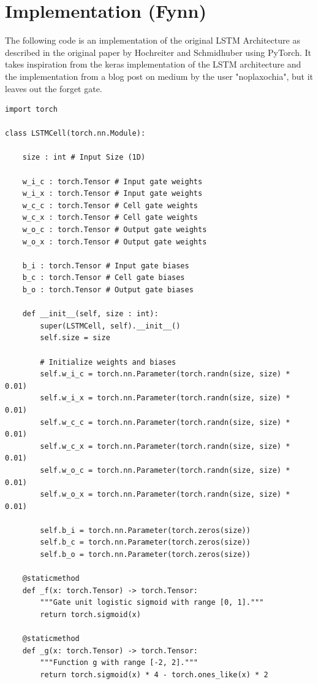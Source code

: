 \documentclass[twoside,a4paper,10pt,DIV=12,BCOR=12mm]{scrartcl}
\begin{document}
\appendix

\section{Implementation (Fynn)}

The following code is an implementation of the original LSTM Architecture as described in the original paper by Hochreiter and Schmidhuber using PyTorch. It takes inspiration from the keras implementation of the LSTM architecture and the implementation from a blog post on medium by the user "noplaxochia", but it leaves out the forget gate.

\begin{lstlisting}
import torch

class LSTMCell(torch.nn.Module):
    
    size : int # Input Size (1D)
    
    w_i_c : torch.Tensor # Input gate weights
    w_i_x : torch.Tensor # Input gate weights
    w_c_c : torch.Tensor # Cell gate weights
    w_c_x : torch.Tensor # Cell gate weights
    w_o_c : torch.Tensor # Output gate weights
    w_o_x : torch.Tensor # Output gate weights
    
    b_i : torch.Tensor # Input gate biases
    b_c : torch.Tensor # Cell gate biases
    b_o : torch.Tensor # Output gate biases
    
    def __init__(self, size : int):
        super(LSTMCell, self).__init__()
        self.size = size

        # Initialize weights and biases        
        self.w_i_c = torch.nn.Parameter(torch.randn(size, size) * 0.01)
        self.w_i_x = torch.nn.Parameter(torch.randn(size, size) * 0.01)
        self.w_c_c = torch.nn.Parameter(torch.randn(size, size) * 0.01)
        self.w_c_x = torch.nn.Parameter(torch.randn(size, size) * 0.01)
        self.w_o_c = torch.nn.Parameter(torch.randn(size, size) * 0.01)
        self.w_o_x = torch.nn.Parameter(torch.randn(size, size) * 0.01)
        
        self.b_i = torch.nn.Parameter(torch.zeros(size))
        self.b_c = torch.nn.Parameter(torch.zeros(size))
        self.b_o = torch.nn.Parameter(torch.zeros(size))    
        
    @staticmethod
    def _f(x: torch.Tensor) -> torch.Tensor:
        """Gate unit logistic sigmoid with range [0, 1]."""
        return torch.sigmoid(x)
    
    @staticmethod
    def _g(x: torch.Tensor) -> torch.Tensor:
        """Function g with range [-2, 2]."""
        return torch.sigmoid(x) * 4 - torch.ones_like(x) * 2
    

\end{lstlisting}
\end{document}
